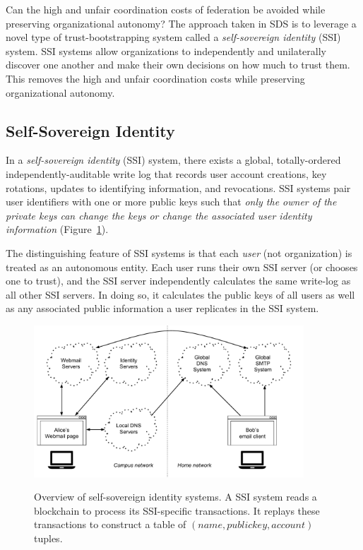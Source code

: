 Can the high and unfair coordination costs of federation be avoided while
preserving organizational autonomy?  The approach taken in SDS is to leverage a
novel type of trust-bootstrapping system called a \emph{self-sovereign identity}
(SSI) system.  SSI systems allow organizations to independently and unilaterally
discover one another and make their own decisions on how much to trust them.
This removes the high and unfair coordination costs while preserving
organizational autonomy.

\subsection{Self-Sovereign Identity}
\label{sec:chap2-ssi}

In a \emph{self-sovereign identity} (SSI) system, there exists a global,
totally-ordered independently-auditable write log that records user account creations, key rotations,
updates to identifying information, and revocations.  SSI systems 
pair user identifiers with one or more public keys such that \emph{only the 
owner of the private keys can 
change the keys or change the associated user identity information}
(Figure~\ref{fig:chap2-ssi-system}).

The distinguishing feature of SSI systems is that each \emph{user} (not
organization) is treated as an autonomous entity.  Each user runs their own
SSI server (or chooses one to trust), and the SSI server independently
calculates the same write-log as all other SSI servers.
In doing so, it calculates the public keys of all users as well as any
associated public information a user replicates in the SSI system.

\begin{figure}[h!]
   \caption{Overview of self-sovereign identity systems.  A SSI system reads a
   blockchain to process its SSI-specific transactions.  It replays these
   transactions to construct a table of $(name, public key, account)$ tuples.}
   \centering
   \includegraphics[width=0.9\textwidth,page=14]{figures/dissertation-figures}
   \label{fig:chap2-ssi-system}
\end{figure}

